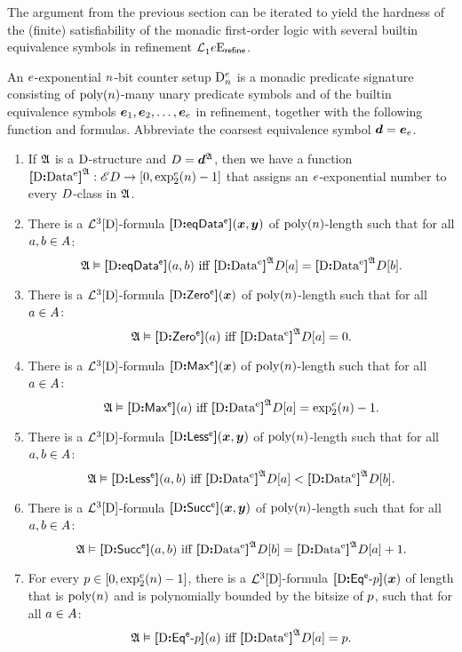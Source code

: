 The argument from the previous section can be iterated to yield the hardness of
the (finite) satisfiability of the monadic first-order logic with several
builtin equivalence symbols in refinement $\mathcal{L}^{{}}_{1}{e}\mathrm{E}_{\mathsf{refine}}$.

\begin{definition}
An $e$-exponential $n$-bit counter setup $\mathrm{D}_n^e$ is a monadic
predicate signature consisting of $\operatorname{poly}(n)$-many unary predicate symbols and of
the builtin equivalence symbols $\bm{e}_{1},\bm{e}_{2},\dots,\bm{e}_{e}$ in refinement,
together with the following function and formulas. Abbreviate the coarsest
equivalence symbol $\bm{d} = \bm{e}_{e}$.
\begin{enumerate}
  \item If $\mathfrak{A}$ is a $\mathrm{D}$-structure and $D = \bm{d}^{\mathfrak{A}}$, then we have
  a function ${\bm{[}\mathrm{D}\mathord{\bm{:}}\mathrm{Data^{e}}\bm{]}}^{\mathfrak{A}} : {\mathscr{E}D} \to [0, \exp_{2}^{e}(n) - 1]$ that
  assigns an $e$-exponential number to every $D$-class in $\mathfrak{A}$.
  \item There is a $\mathcal{L}^{3}[\mathrm{D}]$-formula ${\bm{[}\mathrm{D}\mathord{\bm{:}}\mathsf{eqData^{e}}\bm{]}}(\bm{x},\bm{y})$ of
  $\operatorname{poly}(n)$-length such that for all $a,b \in A$:
  \[
    \miff{
      \StrA \vDash \feeqData\sze\DS(\ea,\eb)}{
      \eData\sze\DS\StrA\relD[\ea] = \eData\sze\DS\StrA\relD[\eb]}.
  \]
  \item There is a $\mathcal{L}^{3}[\mathrm{D}]$-formula ${\bm{[}\mathrm{D}\mathord{\bm{:}}\mathsf{Zero^{e}}\bm{]}}(\bm{x})$ of
  $\operatorname{poly}(n)$-length such that for all $a \in A$:
  \[
    \miff{
      \StrA \vDash \feZero\sze\DS(\ea)}{
      \eData\sze\DS\StrA\relD[\ea] = 0}.
  \]
  \item There is a $\mathcal{L}^{3}[\mathrm{D}]$-formula ${\bm{[}\mathrm{D}\mathord{\bm{:}}\mathsf{Max^{e}}\bm{]}}(\bm{x})$ of
  $\operatorname{poly}(n)$-length such that for all $a \in A$:
  \[
    \miff{
      \StrA \vDash \feMax\sze\DS(\ea)}{
      \eData\sze\DS\StrA\relD[\ea] = \tetr\sze2\nn - 1}.
  \]
  \item There is a $\mathcal{L}^{3}[\mathrm{D}]$-formula ${\bm{[}\mathrm{D}\mathord{\bm{:}}\mathsf{Less^{e}}\bm{]}}(\bm{x},\bm{y})$ of
  $\operatorname{poly}(n)$-length such that for all $a, b \in A$:
  \[
    \miff{
      \StrA \vDash \feLess\sze\DS(\ea,\eb)}{
      \eData\sze\DS\StrA\relD[\ea] < \eData\sze\DS\StrA\relD[\eb]}.
  \]
  \item There is a $\mathcal{L}^{3}[\mathrm{D}]$-formula ${\bm{[}\mathrm{D}\mathord{\bm{:}}\mathsf{Succ^{e}}\bm{]}}(\bm{x},\bm{y})$ of
  $\operatorname{poly}(n)$-length such that for all $a, b \in A$:
  \[
    \miff{
      \StrA \vDash \feSucc\sze\DS(\ea,\eb)}{
      \eData\sze\DS\StrA\relD[\eb] = \eData\sze\DS\StrA\relD[\ea] + 1}.
  \]
  \item For every $p \in [0, \exp_{2}^{e}(n) - 1]$, there is a
  $\mathcal{L}^{3}[\mathrm{D}]$-formula ${\bm{[}\mathrm{D}\mathord{\bm{:}}\mathsf{Eq^{e}}{\hbox{-}}p\bm{]}}(\bm{x})$ of length that is $\operatorname{poly}(n)$ and
  is polynomially bounded by the bitsize of $p$, such that for all $a \in
  A$:
  \[
    \miff{
      \StrA \vDash \feEq\sze\posp\DS(\ea)}{
      \eData\sze\DS\StrA\relD[\ea] = \posp}.
  \]
  
\end{enumerate}
\end{definition}

